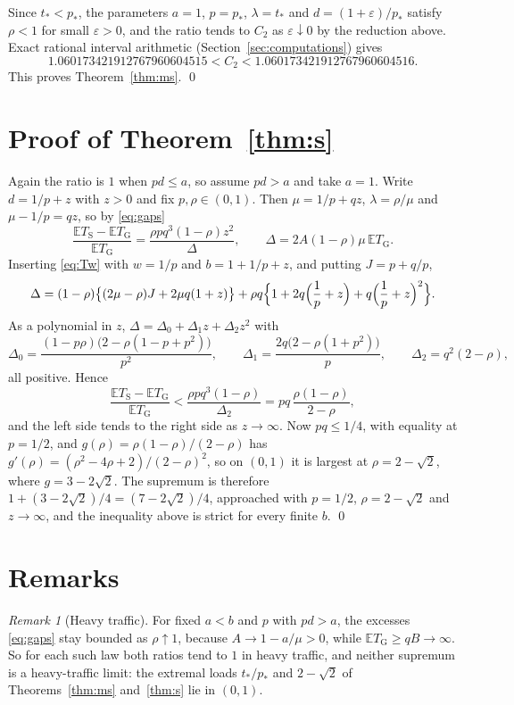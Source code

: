 \documentclass[11pt]{amsart}
\theoremstyle{remark}
\newtheorem{remark}[theorem]{Remark}
\numberwithin{equation}{section}
\newcommand{\E}{\mathbb{E}}
\begin{document}
Since $t_*<p_*$, the parameters $a=1$, $p=p_*$, $\lambda=t_*$ and
$d=(1+\varepsilon)/p_*$ satisfy $\rho<1$ for small $\varepsilon>0$, and
the ratio tends to $C_2$ as $\varepsilon\downarrow0$ by the reduction
above. Exact rational interval arithmetic
(Section~\ref{sec:computations}) gives
\[
1.060173421912767960604515<C_2<1.060173421912767960604516 .
\]
This proves Theorem~\ref{thm:ms}. \qed

\section{Proof of Theorem~\ref{thm:s}}\label{sec:s}

Again the ratio is $1$ when $pd\le a$, so assume $pd>a$ and take $a=1$.
Write $d=1/p+z$ with $z>0$ and fix $p,\rho\in(0,1)$. Then
$\mu=1/p+qz$, $\lambda=\rho/\mu$ and $\mu-1/p=qz$, so by \eqref{eq:gaps}
\[
\frac{\E T_{\mathrm S}-\E T_{\mathrm G}}{\E T_{\mathrm G}}
=\frac{\rho pq^3(1-\rho)z^2}{\Delta},\qquad
\Delta=2A(1-\rho)\mu\,\E T_{\mathrm G}.
\]
Inserting \eqref{eq:Tw} with $w=1/p$ and $b=1+1/p+z$, and putting
$J=p+q/p$,
\[
\Delta=(1-\rho)\bigl\{(2\mu-\rho)J+2\mu q(1+z)\bigr\}
+\rho q\Bigl\{1+2q\Bigl(\frac1p+z\Bigr)+q\Bigl(\frac1p+z\Bigr)^2\Bigr\}.
\]
As a polynomial in $z$, $\Delta=\Delta_0+\Delta_1z+\Delta_2z^2$ with
\[
\Delta_0=\frac{(1-p\rho)\bigl(2-\rho(1-p+p^2)\bigr)}{p^2},\qquad
\Delta_1=\frac{2q\bigl(2-\rho(1+p^2)\bigr)}{p},\qquad
\Delta_2=q^2(2-\rho),
\]
all positive. Hence
\[
\frac{\E T_{\mathrm S}-\E T_{\mathrm G}}{\E T_{\mathrm G}}
<\frac{\rho pq^3(1-\rho)}{\Delta_2}=pq\,\frac{\rho(1-\rho)}{2-\rho},
\]
and the left side tends to the right side as $z\to\infty$. Now
$pq\le1/4$, with equality at $p=1/2$, and $g(\rho)=\rho(1-\rho)/(2-\rho)$
has $g'(\rho)=(\rho^2-4\rho+2)/(2-\rho)^2$, so on $(0,1)$ it is largest at
$\rho=2-\sqrt2$, where $g=3-2\sqrt2$. The supremum is therefore
$1+(3-2\sqrt2)/4=(7-2\sqrt2)/4$, approached with $p=1/2$,
$\rho=2-\sqrt2$ and $z\to\infty$, and the inequality above is strict for
every finite $b$. \qed

\section{Remarks}\label{sec:remarks}

\begin{remark}[Heavy traffic]
For fixed $a<b$ and $p$ with $pd>a$, the excesses \eqref{eq:gaps} stay bounded
as $\rho\uparrow1$, because $A\to1-a/\mu>0$, while $\E T_{\mathrm G}\ge qB\to\infty$.
So for each such law both ratios tend to $1$ in heavy traffic, and
neither supremum is a heavy-traffic limit: the extremal loads $t_*/p_*$ and $2-\sqrt2$ of Theorems~\ref{thm:ms}
and~\ref{thm:s} lie in $(0,1)$.
\end{remark}
\end{document}
